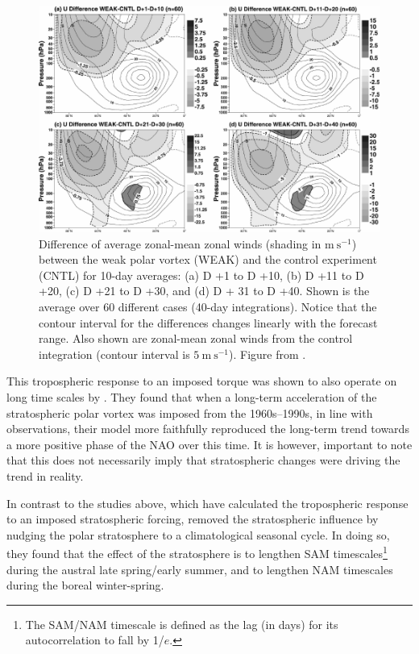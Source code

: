 \begin{figure}
 \centering
 \noindent\includegraphics[width=\textwidth]{figures/chapter-intro/Jung_Barkmeijer.pdf}
 \caption[Numerical simulation results from \citet{Jung2006}]{Difference of
   average zonal-mean zonal winds (shading in $\mathrm{m~s^{-1}}$) between the
   weak polar vortex (WEAK) and the control experiment (CNTL) for 10-day
   averages: (a) D +1 to D +10, (b) D +11 to D +20, (c) D +21 to D +30, and (d)
   D + 31 to D +40. Shown is the average over 60 different cases (40-day
   integrations). Notice that the contour interval for the differences changes
   linearly with the forecast range. Also shown are zonal-mean zonal winds from
   the control integration (contour interval is $\mathrm{5~m~s^{-1}}$). Figure
   from \citet{Jung2006}.}
 \label{fig:jung_barkmeijer}
\end{figure}

This tropospheric response to an imposed torque was shown to also operate on
long time scales by \citet{Scaife2005}. They found that when a long-term
acceleration of the stratospheric polar vortex was imposed from the
1960s--1990s, in line with observations, their model more faithfully reproduced
the long-term trend towards a more positive phase of the NAO over this time. It
is however, important to note that this does not necessarily imply that
stratospheric changes were driving the trend in reality.

In contrast to the studies above, which have calculated the tropospheric
response to an imposed stratospheric forcing, \citet{Simpson2011} removed the
stratospheric influence by nudging the polar stratosphere to a climatological
seasonal cycle. In doing so, they found that the effect of the stratosphere is
to lengthen SAM timescales\footnote{The SAM/NAM timescale is defined as the lag
  (in days) for its autocorrelation to fall by 1/$e$.} during the austral late
spring/early summer, and to lengthen NAM timescales during the boreal
winter-spring.

